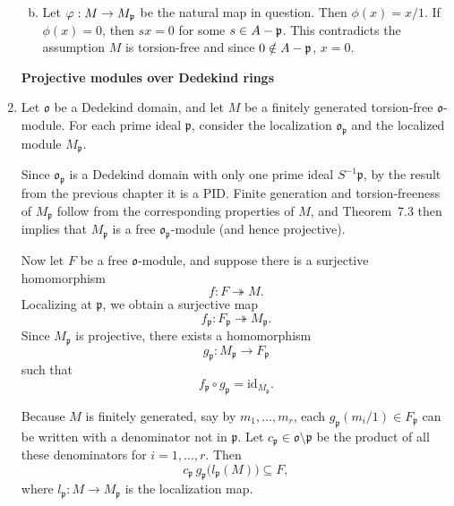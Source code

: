 \documentclass{article}
\theoremstyle{definition}
\theoremstyle{remark}
\begin{document}
\begin{enumerate}[(1)]
\begin{enumerate}[(a)]
\begin{itemize}
                \end{itemize}

                \item Let $\varphi: M \to M_{\mathfrak{p}}$ be the natural map in question. Then $\phi(x) = x/1$. If $\phi(x) = 0$, then $sx = 0$ for some $s \in A - \mathfrak{p}$. This contradicts the assumption $M$ is torsion-free and since $0 \notin A - \mathfrak{p}$, $x = 0$.
        \end{enumerate}

        \newcommand{\ip}{\I p}
        \newcommand{\io}{\I o}
        \textbf{Projective modules over Dedekind rings}
  \item
            Let $\mathfrak{o}$ be a Dedekind domain, and let $M$ be a finitely generated torsion-free $\mathfrak{o}$-module.
            For each prime ideal $\mathfrak{p}$, consider the localization $\mathfrak{o}_{\mathfrak{p}}$ and the localized module $M_{\mathfrak{p}}$.

            Since $\mathfrak{o}_{\mathfrak{p}}$ is a Dedekind domain with only one prime ideal $S^{-1}\mathfrak{p}$, by the result from the previous chapter it is a PID.
            Finite generation and torsion-freeness of $M_{\mathfrak{p}}$ follow from the corresponding properties of $M$, and Theorem~7.3 then implies that $M_{\mathfrak{p}}$ is a free $\mathfrak{o}_{\mathfrak{p}}$-module (and hence projective).

            Now let $F$ be a free $\mathfrak{o}$-module, and suppose there is a surjective homomorphism
            \[
            f: F \twoheadrightarrow M.
            \]
            Localizing at $\mathfrak{p}$, we obtain a surjective map
            \[
            f_{\mathfrak{p}}: F_{\mathfrak{p}} \twoheadrightarrow M_{\mathfrak{p}}.
            \]
            Since $M_{\mathfrak{p}}$ is projective, there exists a homomorphism
            \[
            g_{\mathfrak{p}}: M_{\mathfrak{p}} \to F_{\mathfrak{p}}
            \]
            such that
            \[
            f_{\mathfrak{p}} \circ g_{\mathfrak{p}} = \mathrm{id}_{M_{\mathfrak{p}}}.
            \]

            Because $M$ is finitely generated, say by $m_1,\dots,m_r$, each $g_{\mathfrak{p}}(m_i/1) \in F_{\mathfrak{p}}$ can be written with a denominator not in $\mathfrak{p}$.
            Let $c_{\mathfrak{p}} \in \mathfrak{o} \setminus \mathfrak{p}$ be the product of all these denominators for $i=1,\dots,r$.
            Then
            \[
            c_{\mathfrak{p}}\, g_{\mathfrak{p}}\big(l_{\mathfrak{p}}(M)\big) \subseteq F,
            \]
            where $l_{\mathfrak{p}}: M \to M_{\mathfrak{p}}$ is the localization map.


\end{enumerate}
\end{document}
